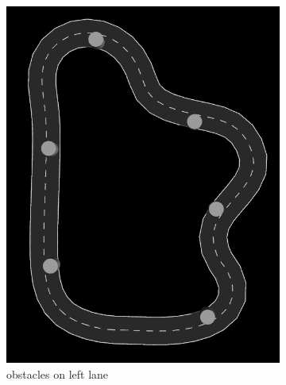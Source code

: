 \begin{figure}[H]
	\begin{subfigure}{.5\linewidth}
		\includegraphics[width=\textwidth]{Pictures/obstacle left final 2}
		\caption{obstacles on left lane}
	\end{subfigure}	
	\begin{subfigure}{.5\linewidth}

\end{subfigure}
\end{figure}
